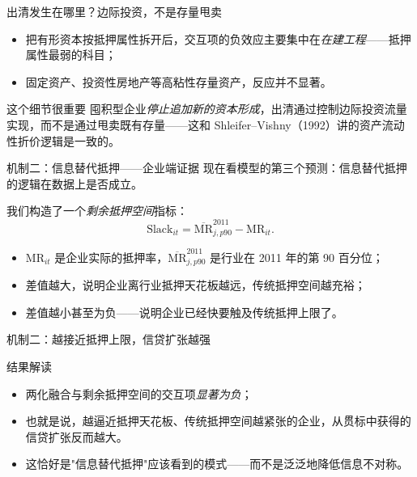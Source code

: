 \begin{frame}{出清发生在哪里？边际投资，不是存量甩卖}
  \begin{itemize}
    \item 把有形资本按抵押属性拆开后，交互项的负效应主要集中在\emph{在建工程}——抵押属性最弱的科目；
    \item 固定资产、投资性房地产等高粘性存量资产，反应并不显著。
  \end{itemize}

  \vspace{0.5em}
  \begin{findingbox}{这个细节很重要}
    囤积型企业\emph{停止追加新的资本形成}，出清通过控制边际投资流量实现，而不是通过甩卖既有存量——这和 Shleifer--Vishny（1992）讲的资产流动性折价逻辑是一致的。
  \end{findingbox}
\end{frame}

\begin{frame}{机制二：信息替代抵押——企业端证据}
  现在看模型的第三个预测：信息替代抵押的逻辑在数据上是否成立。

  \vspace{0.4em}
  我们构造了一个\emph{剩余抵押空间}指标：
  \[
    \text{Slack}_{it}
    =
    \overline{\text{MR}}_{j,p90}^{2011}
    -
    \text{MR}_{it}.
  \]

  \begin{itemize}
    \item $\text{MR}_{it}$ 是企业实际的抵押率，$\overline{\text{MR}}_{j,p90}^{2011}$ 是行业在 2011 年的第 90 百分位；
    \item 差值越大，说明企业离行业抵押天花板越远，传统抵押空间越充裕；
    \item 差值越小甚至为负——说明企业已经快要触及传统抵押上限了。
  \end{itemize}
\end{frame}

\begin{frame}{机制二：越接近抵押上限，信贷扩张越强}
  

  \vspace{0.3em}
  \begin{findingbox}{结果解读}
  \begin{itemize}
    \item 两化融合与剩余抵押空间的交互项\emph{显著为负}；
    \item 也就是说，越逼近抵押天花板、传统抵押空间越紧张的企业，从贯标中获得的信贷扩张反而越大。
    \item 这恰好是"信息替代抵押"应该看到的模式——而不是泛泛地降低信息不对称。
  \end{itemize}
  \end{findingbox}
\end{frame}

